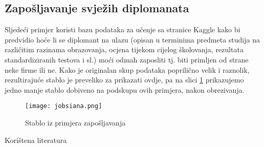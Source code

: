 \documentclass{beamer}
\begin{document}
\subsection{Zapošljavanje svježih diplomanata}
\begin{frame}
Sljedeći primjer koristi bazu podataka za učenje sa stranice Kaggle \cite{kaggle} kako bi predvidio hoće li se diplomant na ulazu
(opisan u terminima predmeta studija na različitim razinama obrazovanja, ocjena tijekom cijelog školovanja, rezultata standardiziranih
testova i sl.) moći odmah zaposliti tj. biti primljen od strane neke firme ili ne. Kako je originalan skup podataka poprilično velik i
raznolik, rezultirajuće stablo je preveliko za prikazati ovdje, pa na slici \ref{jobs}
 prikazujemo jedno manje stablo dobiveno na podskupu ovih primjera,
nakon obrezivanja.

\begin{figure} \label{jobs}
    \texttt{[image: jobsiana.png]}
    \caption{Stablo iz primjera zapošljavanja}
    \end{figure}
\end{frame}

\begin{frame}{Korištena literatura}
    \printbibliography
\end{frame}
\end{document}
